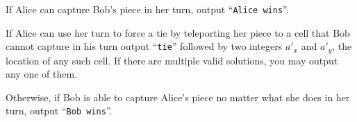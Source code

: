 \begin{Output}
If Alice can capture Bob's piece in her turn, output ``\texttt{Alice wins}''.

If Alice can use her turn to force a tie by teleporting her piece to a cell
that Bob cannot capture in his turn output ``\texttt{tie}'' followed by two
integers $a'_x$ and $a'_y$, the location of any such cell. If there are
multiple valid solutions, you may output any one of them.

Otherwise, if Bob is able to capture Alice's piece no matter what she does in
her turn, output ``\texttt{Bob wins}''.
\end{Output}

